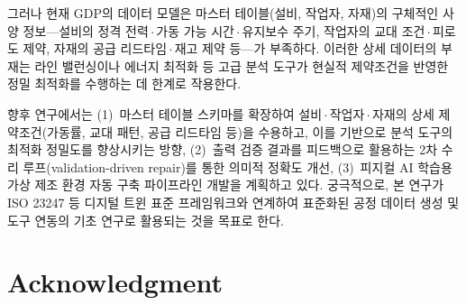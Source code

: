 \documentclass[conference]{IEEEtran}
\begin{document}
그러나 현재 GDP의 데이터 모델은 마스터 테이블(설비, 작업자, 자재)의 구체적인 사양 정보---설비의 정격 전력\,$\cdot$\,가동 가능 시간\,$\cdot$\,유지보수 주기, 작업자의 교대 조건\,$\cdot$\,피로도 제약, 자재의 공급 리드타임\,$\cdot$\,재고 제약 등---가 부족하다. 이러한 상세 데이터의 부재는 라인 밸런싱이나 에너지 최적화 등 고급 분석 도구가 현실적 제약조건을 반영한 정밀 최적화를 수행하는 데 한계로 작용한다.

향후 연구에서는 (1)~마스터 테이블 스키마를 확장하여 설비\,$\cdot$\,작업자\,$\cdot$\,자재의 상세 제약조건(가동률, 교대 패턴, 공급 리드타임 등)을 수용하고, 이를 기반으로 분석 도구의 최적화 정밀도를 향상시키는 방향, (2)~출력 검증 결과를 피드백으로 활용하는 2차 수리 루프(validation-driven repair)를 통한 의미적 정확도 개선, (3)~피지컬 AI 학습용 가상 제조 환경 자동 구축 파이프라인 개발을 계획하고 있다. 궁극적으로, 본 연구가 ISO 23247 등 디지털 트윈 표준 프레임워크와 연계하여 표준화된 공정 데이터 생성 및 도구 연동의 기초 연구로 활용되는 것을 목표로 한다.

\section*{Acknowledgment}

\end{document}
